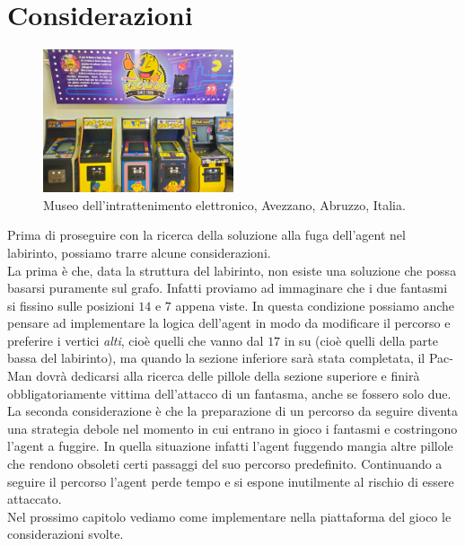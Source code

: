\documentclass[8pt]{book}
\begin{document}
\section{Considerazioni}

\begin{figure}
  \centering
  \includegraphics[width=0.5\textwidth]{img/imgConLicenza/postazioni/postazioni.jpg}
  \caption{Museo dell'intrattenimento elettronico, Avezzano, Abruzzo, Italia.}
  \label{postazioni}
\end{figure}

Prima di proseguire con la ricerca della soluzione alla fuga dell'agent nel labirinto, possiamo trarre alcune considerazioni.\\

La prima è che, data la struttura del labirinto, non esiste una soluzione che possa basarsi puramente sul grafo. Infatti proviamo ad immaginare che i due fantasmi si fissino sulle posizioni $14$ e $7$ appena viste. In questa condizione possiamo anche pensare ad implementare la logica dell'agent in modo da modificare il percorso e preferire i vertici \emph{alti}, cioè quelli che vanno dal $17$ in su (cioè quelli della parte bassa del labirinto), ma quando la sezione inferiore sarà stata completata, il Pac-Man dovrà dedicarsi alla ricerca delle pillole della sezione superiore e finirà obbligatoriamente vittima dell'attacco di un fantasma, anche se fossero solo due.\\

La seconda considerazione è che la preparazione di un percorso da seguire diventa una strategia debole nel momento in cui entrano in gioco i fantasmi e costringono l'agent a fuggire. In quella situazione infatti l'agent fuggendo mangia altre pillole che rendono obsoleti certi passaggi del suo percorso predefinito. Continuando a seguire il percorso l'agent perde tempo e si espone inutilmente al rischio di essere attaccato.\\

Nel prossimo capitolo vediamo come implementare nella piattaforma del gioco le considerazioni svolte.
\end{document}
